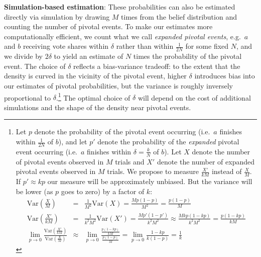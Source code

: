 \documentclass[11pt,a4paper]{article}
\begin{document}
\noindent \textbf{Simulation-based estimation}: These probabilities can also be %
estimated directly via simulation by drawing $M$ times from the belief distribution and counting the number of pivotal events. To make our estimates more computationally efficient, we count what we call \emph{expanded pivotal events}, e.g.\ $a$ and $b$ receiving vote shares within $\delta$ rather than within $\frac{1}{2N}$ for some fixed $N$, and we divide by $2 \delta$ to yield an estimate of $N$ times the probability of the pivotal event. %
The choice of $\delta$ reflects a bias-variance tradeoff: to the extent that the density is curved in the vicinity of the pivotal event, higher $\delta$ introduces bias into our estimates of pivotal probabilities, but the variance is roughly inversely proportional to $\delta$.\footnote{Let $p$ denote the probability of the pivotal event occurring (i.e.\ $a$ finishes within $\frac{1}{2N}$ of $b$), and let $p'$ denote the probability of the \emph{expanded} pivotal event occurring (i.e.\ $a$ finishes within $\delta = \frac{k}{N}$ 
of $b$). Let $X$ denote the number of pivotal events observed in $M$ trials and $X'$ denote the number of expanded pivotal events observed in $M$ trials. We propose to measure $\frac{X'}{kM}$ instead of $\frac{X}{M}$. If $p' \approx kp$ our measure will be approximately unbiased. But the variance will be lower (as $p$ goes to zero) by a factor of $k$: 
\begin{eqnarray}
\text{Var}\left(\frac{X}{M}\right) &=& \frac{1}{M^2} \text{Var}(X) =  \frac{M p (1 - p)}{M^2} = \frac{p(1-p)}{M} \nonumber \\ 
\text{Var}\left(\frac{X'}{kM}\right) &=& \frac{1}{k^2 M^2} \text{Var}(X') = \frac{M p' (1 - p')}{k^2 M^2}  %
 \approx  \frac{M k p (1 - kp)}{k^2 M^2} = \frac{p(1 - kp)}{kM}  \nonumber \\ %
 \lim_{p \rightarrow 0} \frac{\text{Var}\left(\frac{X'}{kM}\right)}{\text{Var}\left(\frac{X}{M}\right)} &\approx&  \lim_{p \rightarrow 0} \frac{\frac{p(1-kp)}{kM}}{\frac{p(1-p)}{M}} = \lim_{p \rightarrow 0} \frac{1 - kp}{k(1 - p)} = \frac{1}{k}
\end{eqnarray}     
} The optimal choice of $\delta$ will depend on the cost of additional simulations and the shape of the density near pivotal events.\\ 
\end{document}
